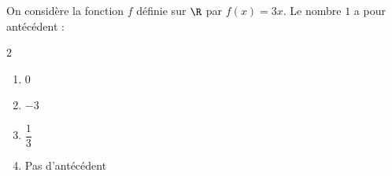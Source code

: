 \begin{exo}{}
	On considère la fonction $f$ définie sur $\R$ par $f(x) = 3x$. Le nombre $1$ a pour antécédent :
	\vspace*{-2mm}\begin{multicols}{2}
	\begin{enumerate}
		\item $0$
		\item $-3$
		\item $\dfrac{1}{3}$
		\item Pas d'antécédent
	\end{enumerate}
	\end{multicols}
\end{exo}
